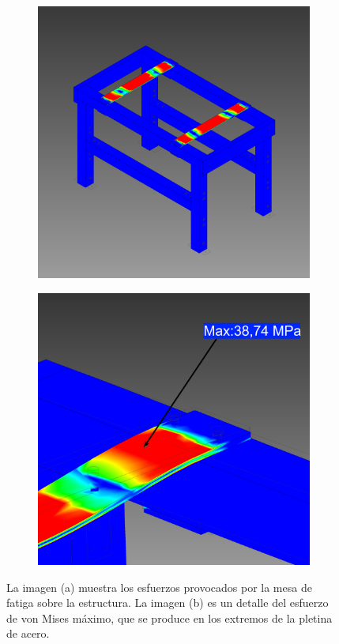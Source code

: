 \begin{figure}[h]
\centering
	\begin{subfigure}{0.49\linewidth}
		\centering
		\includegraphics[width=1\linewidth]{Imagenes/rmesa_gen.png}
		\caption{}\label{fig:rmesa_gen}
	\end{subfigure}%
	\begin{subfigure}{0.49\linewidth}
		\centering
		\includegraphics[width=1\linewidth]{Imagenes/rmesa_det.png}
		\caption{}\label{fig:rmesa_det}
	\end{subfigure}
\caption{La imagen (a) muestra los esfuerzos provocados por la mesa de fatiga sobre la estructura. La imagen (b) es un detalle del esfuerzo de von Mises máximo, que se produce en los extremos de la pletina de acero.}
\label{fig:resultados_mesa}
\end{figure}

